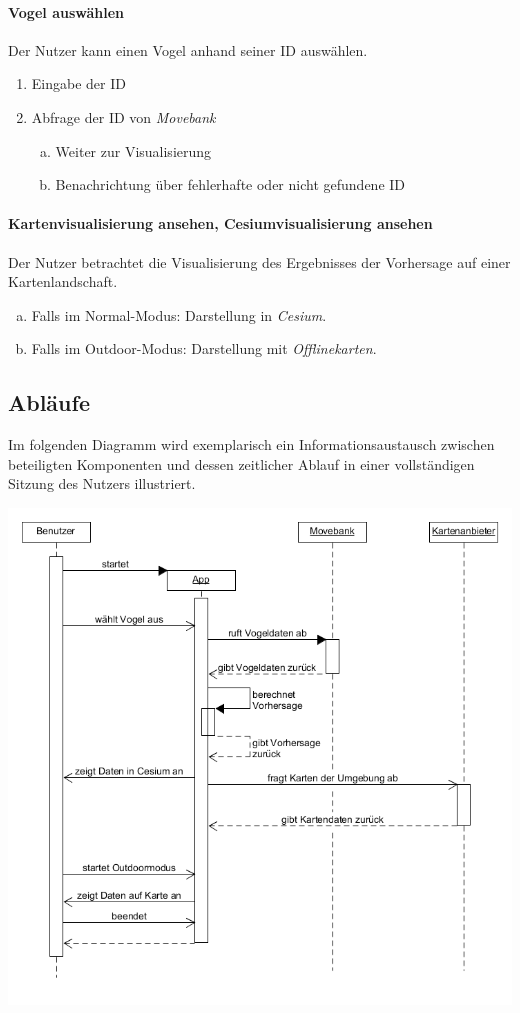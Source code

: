\documentclass[12pt]{article} %
\newenvironment{cptenumerate}[1][label=\arabic*.]{\begin{enumerate}[#1] \setlength\itemsep{0em}}{\end{enumerate}}
\begin{document}
 \paragraph{Vogel auswählen} Der Nutzer kann einen Vogel anhand seiner ID auswählen.
 \begin{cptenumerate} 
     	 \item Eingabe der ID
     	 \item Abfrage der ID von \textit{Movebank}
     	 \begin{cptenumerate}[a.]
     	   	 \item Weiter zur Visualisierung
     	   	 \item Benachrichtung über fehlerhafte oder nicht gefundene ID
     	  \end{cptenumerate}  
    \end{cptenumerate}    

\paragraph{Kartenvisualisierung ansehen, Cesiumvisualisierung ansehen} Der Nutzer betrachtet die Visualisierung des Ergebnisses der Vorhersage auf einer Kartenlandschaft.
\begin{cptenumerate}[a.]
 	 \item Falls im Normal-Modus: Darstellung in \textit{Cesium}.
 	 \item Falls im Outdoor-Modus: Darstellung mit \textit{Offlinekarten}. 
\end{cptenumerate}


\subsection{Abläufe}

Im folgenden Diagramm wird exemplarisch ein Informationsaustausch zwischen beteiligten Komponenten und dessen zeitlicher Ablauf in einer vollständigen Sitzung des Nutzers illustriert. 

\includegraphics[width = 1\linewidth]{Sequenzdiagramm.png}
\end{document}

